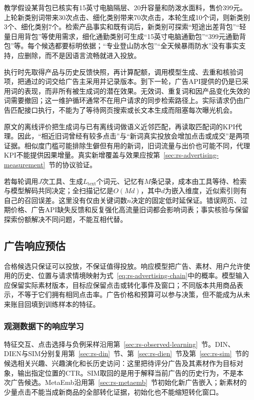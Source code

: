 教学假设某背包已核实有15英寸电脑隔层、20升容量和防泼水面料，售价399元。上轮新类别词带来30次点击、细化类别带来70次点击，本轮生成10个词，则新类别3个、细化类别7个。检索产品事实和既有词后，新类别可探索“短途出差背包”“轻量日用背包”等使用需求，细化通勤类别可生成“15英寸电脑通勤包”“399元通勤背包”等。每个候选都要标明依据；“专业登山防水包”“全天候暴雨防水”没有事实支持，应删除，而不是因语言流畅就进入投放。

执行时先取得产品与历史反馈快照，再计算配额，调用模型生成、去重和核验词项，把通过的词交给广告主采用并记录版本。到下一轮，广告API提供的仍是已采用词的表现，而非所有被生成词的潜在效果。无效词、重复词和因产品变化失效的词需要撤回；这一维护循环通常不在用户请求的同步检索路径上。实际请求仍由广告匹配接口执行，不能为了等待网页搜索或长文本生成而阻塞每次曝光机会。

原文的离线评价把生成词与已有离线词做语义近邻匹配，再读取匹配词的KPI代理。因此，“相近旧词曾经有较多点击”与“新词真实投放会增加点击或成交”是两项证据。相似度门槛可能排除生僻但有用的新词，旧词流量与出价也可能不同，代理KPI不能提供因果增量。真实新增覆盖与效果应按第~\ref{sec:rs-advertising-measurement}~节的协议验证。

若每轮调用$J$次工具、生成$L_{\mathrm{text}}$个词元、记忆有$M$条记录，成本由工具等待、检索与模型解码共同决定；全扫描记忆是$O(Md)$，其中$d$为嵌入维度，近似索引则有自己的召回误差。这里没有仅由关键词数$n$决定的固定低时延保证。错误网页、过期价格、广告API缺失反馈和反复强化高流量旧词都会影响词表；事实核验与保留探索份额解决不同问题，不能互相代替。

\subsection{广告响应预估}
\label{sec:rs-advertising-response}

合格候选只保证可以投放，不保证值得投放。响应模型把广告、素材、用户允许使用的历史、位置与请求情境映射为式~\eqref{eq:rs-advertising-chain}中的概率。模型输入应保留实际素材版本，目标应保留点击或转化事件及窗口；不同版本共用商品表示，不等于它们拥有相同点击率。广告价格和预算可以参与决策，但不能成为从未来账目回填到训练样本的特征。

\subsubsection{观测数据下的响应学习}
\label{sec:rs-advertising-observed-response}

特征交互、点击选择与负例采样沿用第~\ref{sec:rs-observed-learning}~节。DIN、DIEN与SIM分别复用第~\ref{sec:rs-din}~节、第~\ref{sec:rs-dien}~节及第~\ref{sec:rs-sim}~节的候选相关兴趣、兴趣演化和长历史访问：这里把待评分广告及其素材作为目标对象，输出指定位置的CTR。SIM取回的是用于解释当前广告的历史行为，不是本次广告候选。MetaEmb沿用第~\ref{sec:rs-metaemb}~节初始化新广告嵌入；新素材的少量点击不能当成新商品的全部转化证据，初始化也不能缩短转化窗口。

